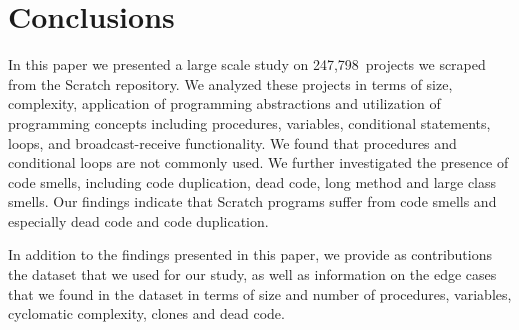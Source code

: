 \documentclass{sig-alternate}
\newcommand{\nAnalyzedPrograms}{247,798}
\begin{document}

\section{Conclusions}
\label{sec:conclusion}
In this paper we presented a large scale study on \nAnalyzedPrograms~projects we scraped from the Scratch repository. We analyzed these projects in terms of size, complexity, application of programming abstractions and utilization of programming concepts including procedures, variables, conditional statements, loops, and broadcast-receive functionality. We found that procedures and conditional loops are not commonly used. We further investigated the presence of code smells, including code duplication, dead code, long method and large class smells. Our findings indicate that Scratch programs suffer from code smells and especially dead code and code duplication.

In addition to the findings presented in this paper, we provide as contributions the dataset that we used for our study, as well as information on the edge cases that we found in the dataset in terms of size and number of procedures, variables, cyclomatic complexity, clones and dead code.\footnotemark[\ref{repo}]



\end{document}
